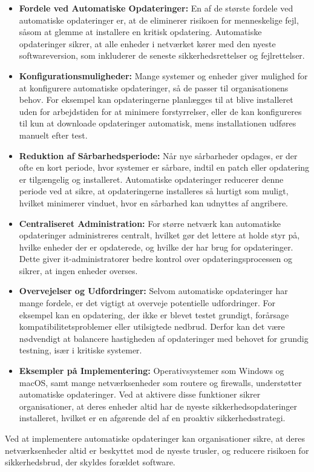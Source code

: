 \begin{itemize}
	\item \textbf{Fordele ved Automatiske Opdateringer:} En af de største fordele ved automatiske opdateringer er, at de eliminerer risikoen for menneskelige fejl, såsom at glemme at installere en kritisk opdatering. Automatiske opdateringer sikrer, at alle enheder i netværket kører med den nyeste softwareversion, som inkluderer de seneste sikkerhedsrettelser og fejlrettelser.
	
	\item \textbf{Konfigurationsmuligheder:} Mange systemer og enheder giver mulighed for at konfigurere automatiske opdateringer, så de passer til organisationens behov. For eksempel kan opdateringerne planlægges til at blive installeret uden for arbejdstiden for at minimere forstyrrelser, eller de kan konfigureres til kun at downloade opdateringer automatisk, mens installationen udføres manuelt efter test.
	
	\item \textbf{Reduktion af Sårbarhedsperiode:} Når nye sårbarheder opdages, er der ofte en kort periode, hvor systemer er sårbare, indtil en patch eller opdatering er tilgængelig og installeret. Automatiske opdateringer reducerer denne periode ved at sikre, at opdateringerne installeres så hurtigt som muligt, hvilket minimerer vinduet, hvor en sårbarhed kan udnyttes af angribere.
	
	\item \textbf{Centraliseret Administration:} For større netværk kan automatiske opdateringer administreres centralt, hvilket gør det lettere at holde styr på, hvilke enheder der er opdaterede, og hvilke der har brug for opdateringer. Dette giver it-administratorer bedre kontrol over opdateringsprocessen og sikrer, at ingen enheder overses.
	
	\item \textbf{Overvejelser og Udfordringer:} Selvom automatiske opdateringer har mange fordele, er det vigtigt at overveje potentielle udfordringer. For eksempel kan en opdatering, der ikke er blevet testet grundigt, forårsage kompatibilitetsproblemer eller utilsigtede nedbrud. Derfor kan det være nødvendigt at balancere hastigheden af opdateringer med behovet for grundig testning, især i kritiske systemer.
	
	\item \textbf{Eksempler på Implementering:} Operativsystemer som Windows og macOS, samt mange netværksenheder som routere og firewalls, understøtter automatiske opdateringer. Ved at aktivere disse funktioner sikrer organisationer, at deres enheder altid har de nyeste sikkerhedsopdateringer installeret, hvilket er en afgørende del af en proaktiv sikkerhedsstrategi.
\end{itemize}
\noindent
Ved at implementere automatiske opdateringer kan organisationer sikre, at deres netværksenheder altid er beskyttet mod de nyeste trusler, og reducere risikoen for sikkerhedsbrud, der skyldes forældet software.


